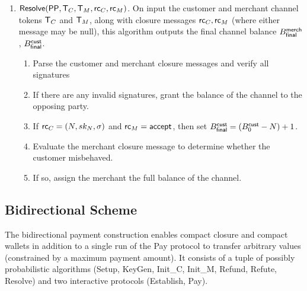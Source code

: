 \documentclass[11pt]{report}
\begin{document}
\begin{enumerate}
\item ${\sf Resolve}({\sf PP}, {\sf T}_{C}, {\sf T}_{M}, {\sf rc}_{C}, {\sf rc}_{M})$. On input the customer and merchant channel tokens ${\sf T}_{C}$ and ${\sf T}_{M}$, along with closure messages ${\sf rc}_{C}, {\sf rc}_{M}$ (where either message may be {\sf null}), this algorithm outputs the final channel balance ${B_{\sf final}^{\sf merch}}$, ${B_{\sf final}^{\sf cust}}$.
\begin{enumerate}
\item Parse the customer and merchant closure messages and verify all signatures
\item If there are any invalid signatures, grant the balance of the channel to the opposing party.
\item If ${\sf rc}_{C} = (N, sk_{N}, \sigma)$ and ${\sf rc}_{M} = {\sf accept}$, then set ${B_{\sf final}^{\sf cust}} = ({B_{0}^{\sf cust}} - N) + 1$.
\item Evaluate the merchant closure message to determine whether the customer misbehaved. 
\item If so, assign the merchant the full balance of the channel.
\end{enumerate}

\end{enumerate}

\subsection{Bidirectional Scheme}

The bidirectional payment construction enables compact closure and compact wallets in addition to a single run of the {\sf Pay} protocol to transfer arbitrary values (constrained by a maximum payment amount). It consists of a tuple of possibly probabilistic algorithms ({\sf Setup}, {\sf KeyGen}, {\sf Init}_{C}, {\sf Init}_{M}, {\sf Refund}, {\sf Refute}, {\sf Resolve}) and two interactive protocols ({\sf Establish}, {\sf Pay}).
\end{document}
